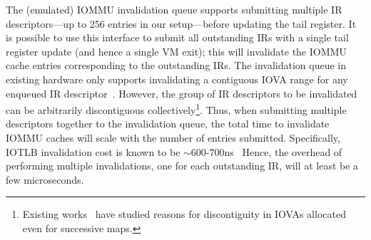 The (emulated) IOMMU invalidation queue supports submitting 
    multiple IR descriptors---up to 256 entries in our setup---before updating the tail register. 
It is possible to use this interface to submit all outstanding IRs with a single tail register update (and hence a single VM exit); 
this will invalidate the IOMMU cache entries corresponding to the outstanding IRs. 
The invalidation queue in existing hardware only supports invalidating a contiguous IOVA range 
    for any enqueued IR descriptor~\cite{intel_scalable_iov_spec}. 
However, the group of IR descriptors to be invalidated can be arbitrarily discontiguous 
    collectively\footnote{Existing works~\cite{Rubin2024FastSafe} have studied reasons 
        for discontiguity in IOVAs allocated even for successive maps.}.
Thus, when submitting multiple descriptors together to the invalidation queue, 
    the total time to invalidate IOMMU caches will scale with the number of entries submitted. 
Specifically, IOTLB invalidation cost is known to be ${\sim}{600}$-${700}$ns~\cite{Malka2015rIOMMU}
Hence, the overhead of performing multiple invalidations, one for each outstanding IR, will at least be a few microseconds.


